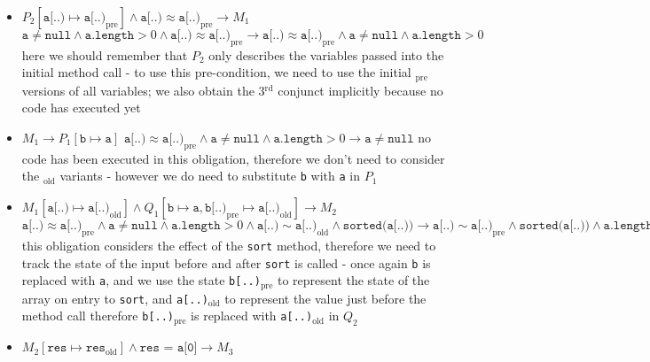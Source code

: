 \documentclass[a4paper, 12pt]{article}
\begin{document}
                \begin{itemize}
                    \itemsep0em
                    \item $P_2[\texttt{a[..)} \mapsto \texttt{a[..)}_\text{pre}] \land \texttt{a[..)} \approx \texttt{a[..)}_\text{pre} \rightarrow M_1$
                        \subitem $\texttt{a} \neq \texttt{null} \land \texttt{a.length} > 0 \land \texttt{a[..)} \approx \texttt{a[..)}_\text{pre} \rightarrow \texttt{a[..)} \approx \texttt{a[..)}_\text{pre} \land \texttt{a} \neq \texttt{null} \land \texttt{a.length} > 0$
                        \subitem here we should remember that $P_2$ only describes the variables passed into the initial method call - to use this pre-condition, we need to use the initial $_\text{pre}$ versions of all variables; we also obtain the 3$^\text{rd}$ conjunct implicitly because no code has executed yet
                    \item $M_1 \rightarrow P_1[\texttt{b} \mapsto \texttt{a}]$
                        \subitem $\texttt{a[..)} \approx \texttt{a[..)}_\text{pre} \land \texttt{a} \neq \texttt{null} \land \texttt{a.length} > 0 \rightarrow \texttt{a} \neq \texttt{null}$
                        \subitem no code has been executed in this obligation, therefore we don't need to consider the $_\text{old}$ variants - however we do need to substitute \texttt{b} with \texttt{a} in $P_1$
                    \item $M_1[\texttt{a[..)} \mapsto \texttt{a[..)}_\text{old}] \land Q_1[\texttt{b} \mapsto \texttt{a}, \texttt{b[..)}_\text{pre} \mapsto \texttt{a[..)}_\text{old}] \rightarrow M_2$
                        \subitem $\texttt{a[..)} \approx \texttt{a[..)}_\text{pre} \land \texttt{a} \neq \texttt{null} \land \texttt{a.length} > 0 \land \texttt{a[..)} \sim \texttt{a[..)}_\text{old} \land \texttt{sorted(a[..))} \rightarrow \texttt{a[..)} \sim \texttt{a[..)}_\text{pre} \land \texttt{sorted(a[..))} \land \texttt{a.length} > 0$
                        \subitem this obligation considers the effect of the \texttt{sort} method, therefore we need to track the state of the input before and after \texttt{sort} is called - once again \texttt{b} is replaced with \texttt{a}, and we use the state \texttt{b[..)}$_\text{pre}$ to represent the state of the array on entry to \texttt{sort}, and \texttt{a[..)}$_\text{old}$ to represent the value just before the method call therefore \texttt{b[..)}$_\text{pre}$ is replaced with \texttt{a[..)}$_\text{old}$ in $Q_2$
                    \item $M_2[\texttt{res} \mapsto \texttt{res}_\text{old}] \land \texttt{res = a[0]} \rightarrow M_3$

\end{itemize}
\end{document}
